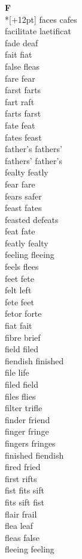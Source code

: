\vspace{14pt}
\noindent\textbf{\Large F}\\*[+12pt]
faces cafes\\
facilitate laetificat\\
fade deaf\\
fait fiat\\
false fleas\\
fare fear\\
farst farts\\
fart raft\\
farts farst\\
fate feat\\
fates feast\\
father's fathers'\\
fathers' father's\\
fealty featly\\
fear fare\\
fears safer\\
feast fates\\
feasted defeats\\
feat fate\\
featly fealty\\
feeling fleeing\\
feels flees\\
feet fete\\
felt left\\
fete feet\\
fetor forte\\
fiat fait\\
fibre brief\\
field filed\\
fiendish finished\\
file life\\
filed field\\
files flies\\
filter trifle\\
finder friend\\
finger fringe\\
fingers fringes\\
finished fiendish\\
fired fried\\
first rifts\\
fist fits sift\\
fits sift fist\\
flair frail\\
flea leaf\\
fleas false\\
fleeing feeling\\
